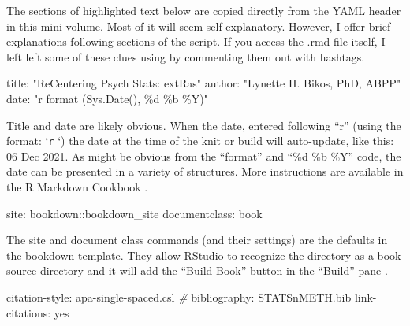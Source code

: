 \documentclass[
]{book}
\newenvironment{Shaded}{\begin{snugshade}}{\end{snugshade}}
\newcommand{\CommentTok}[1]{\textcolor[rgb]{0.56,0.35,0.01}{\textit{#1}}}
\newcommand{\NormalTok}[1]{#1}
\newcommand{\SpecialCharTok}[1]{\textcolor[rgb]{0.00,0.00,0.00}{#1}}
\newcommand{\StringTok}[1]{\textcolor[rgb]{0.31,0.60,0.02}{#1}}
\begin{document}
The sections of highlighted text below are copied directly from the YAML header in this mini-volume. Most of it will seem self-explanatory. However, I offer brief explanations following sections of the script. If you access the .rmd file itself, I left left some of these clues using by commenting them out with hashtags.

\begin{Shaded}
\begin{Highlighting}[]
\NormalTok{title}\SpecialCharTok{:} \StringTok{"ReCentering Psych Stats: extRas"}
\NormalTok{author}\SpecialCharTok{:} \StringTok{"Lynette H. Bikos, PhD, ABPP"}
\NormalTok{date}\SpecialCharTok{:} \StringTok{"\textasciigrave{}r format (Sys.Date(), \textquotesingle{}\%d \%b \%Y\textquotesingle{})\textasciigrave{}"}
\end{Highlighting}
\end{Shaded}

Title and date are likely obvious. When the date, entered following ``r'' (using the format: `\texttt{r} `) the date at the time of the knit or build will auto-update, like this: 06 Dec 2021. As might be obvious from the ``format'' and ``\%d \%b \%Y'' code, the date can be presented in a variety of structures. More instructions are available in the R Markdown Cookbook \citep{xie_r_2021}.

\begin{Shaded}
\begin{Highlighting}[]
\NormalTok{site}\SpecialCharTok{:}\NormalTok{ bookdown}\SpecialCharTok{::}\NormalTok{bookdown\_site}
\NormalTok{documentclass}\SpecialCharTok{:}\NormalTok{ book}
\end{Highlighting}
\end{Shaded}

The site and document class commands (and their settings) are the defaults in the bookdown template. They allow RStudio to recognize the directory as a book source directory and it will add the ``Build Book'' button in the ``Build'' pane \citep{xie_r_2021}.

\begin{Shaded}
\begin{Highlighting}[]
\NormalTok{citation}\SpecialCharTok{{-}}\NormalTok{style}\SpecialCharTok{:}\NormalTok{ apa}\SpecialCharTok{{-}}\NormalTok{single}\SpecialCharTok{{-}}\NormalTok{spaced.csl }\CommentTok{\#}
\NormalTok{bibliography}\SpecialCharTok{:}\NormalTok{ STATSnMETH.bib }
\NormalTok{link}\SpecialCharTok{{-}}\NormalTok{citations}\SpecialCharTok{:}\NormalTok{ yes}
\end{Highlighting}
\end{Shaded}
\end{document}
